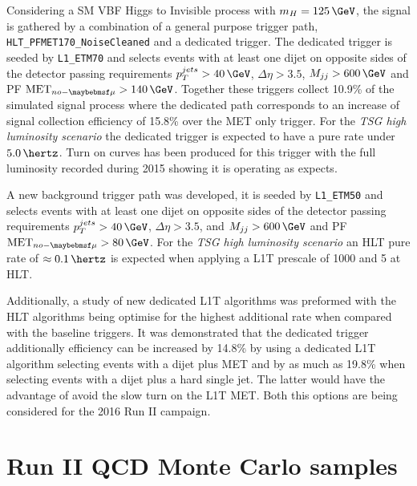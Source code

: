 Considering a \gls{SM} \gls{VBF} Higgs to Invisible process with $m_H=125\,\GeV$, the signal is gathered by a combination of a general purpose trigger path, \verb|HLT_PFMET170_NoiseCleaned| and a dedicated trigger. The dedicated trigger is seeded by \verb|L1_ETM70| and selects events with at least one dijet on opposite sides of the detector passing requirements $p_T^{jets}>40\,\GeV$, $\Delta\eta>3.5$, $M_{jj}>600\,\GeV$ and \gls{PF} $\text{MET}_{no-\mu}>140\,\GeV$. Together these triggers collect 10.9\% of the simulated signal process where the dedicated path corresponds to an increase of signal collection efficiency of 15.8\% over the \gls{MET} only trigger. For the \textit{\gls{TSG} high luminosity scenario} the dedicated trigger is expected to have a pure rate under $5.0\,\hertz$. Turn on curves has been produced for this trigger with the full luminosity recorded during 2015 showing it is operating as expects.

A new background trigger path was developed, it is seeded by \verb|L1_ETM50| and selects events with at least one dijet on opposite sides of the detector passing requirements $p_T^{jets}>40\,\GeV$, $\Delta\eta>3.5$, and $M_{jj}>600\,\GeV$ and \gls{PF} $\text{MET}_{no-\mu}>80\,\GeV$. For the \textit{\gls{TSG} high luminosity scenario} an \gls{HLT} pure rate of $\approx 0.1\,\hertz$ is expected when applying a \gls{L1T} prescale of 1000 and 5 at \gls{HLT}.

Additionally, a study of new dedicated \gls{L1T} algorithms was preformed with the \gls{HLT} algorithms being optimise for the highest additional rate when compared with the baseline triggers. It was demonstrated that the dedicated trigger additionally efficiency can be increased by 14.8\% by using a dedicated \gls{L1T} algorithm selecting events with a dijet plus \gls{MET} and by as much as 19.8\% when selecting events with a dijet plus a hard single jet. The latter would have the advantage of avoid the slow turn on the \gls{L1T} \gls{MET}. Both this options are being considered for the 2016 Run II campaign.

\section{Run II QCD Monte Carlo samples}
\label{SECTION:RunIIPreparation_RunIIQCDMonteCarloSamples}

